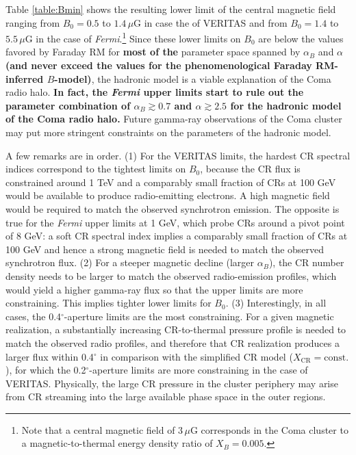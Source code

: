 \documentclass[12pt,manuscript]{aastex}
\def\Fermi{{\em Fermi}\xspace}
\newcommand{\rmn}{\mathrm}
\newcommand{\CR}{\mathrm{CR}}
\begin{document}
Table \ref{table:Bmin} shows the resulting lower limit of the central magnetic field ranging from
$B_{0} = 0.5$ to $1.4\,\mu$G in case the of VERITAS and from $B_{0} = 1.4$ to $5.5\,\mu$G in the
case of \Fermi.\footnote{Note that a central magnetic field of $3\,\mu$G corresponds in the Coma
  cluster to a magnetic-to-thermal energy density ratio of $X_B=0.005$.} Since these lower limits on
$B_{0}$ are below the values favored by Faraday RM for {\bf most of the} parameter space spanned by
$\alpha_{B}$ and $\alpha$ {\bf (and never exceed the values for the phenomenological Faraday
  RM-inferred $B$-model)}, the hadronic model is a viable explanation of the Coma radio halo. {\bf
  In fact, the \Fermi upper limits start to rule out the parameter combination of
  $\alpha_{B}\gtrsim 0.7$ and $\alpha \gtrsim 2.5$ for the hadronic model of the Coma radio halo.}
Future gamma-ray observations of the Coma cluster may put more stringent constraints on the
parameters of the hadronic model.

A few remarks are in order. (1) For the VERITAS limits, the hardest
CR spectral indices correspond to the tightest limits on $B_{0}$, because the CR flux is constrained
around 1 TeV and a comparably small fraction of CRs at 100 GeV would be available to produce
radio-emitting electrons. A high magnetic field would be required to match the observed
synchrotron emission. The opposite is true for the \Fermi upper limits at 1 GeV, which
probe CRs around a pivot point of 8 GeV: a soft CR spectral index implies a comparably small
fraction of CRs at 100 GeV and hence a strong magnetic field is needed to match the observed
synchrotron flux. (2) For a steeper
magnetic decline (larger $\alpha_{B}$), the CR number density needs to be larger to match the
observed radio-emission profiles, which would yield a higher gamma-ray flux so that the upper limits
are more constraining. This implies tighter lower limits for $B_{0}$. (3) Interestingly, in all
cases, the 0.4$^{\circ}$-aperture limits are the most constraining. For a given magnetic
realization, a substantially increasing CR-to-thermal pressure profile is needed to match the
observed radio profiles, and therefore that CR realization produces a larger flux within 
0.4$^{\circ}$ in comparison with the simplified CR model ($X_{\CR} = \rmn{const.}$), for which the
0.2$^{\circ}$-aperture limits are more constraining in the case of VERITAS. Physically, the large
CR pressure in the cluster periphery may arise from CR streaming into the large available phase
space in the outer regions.
\end{document}
